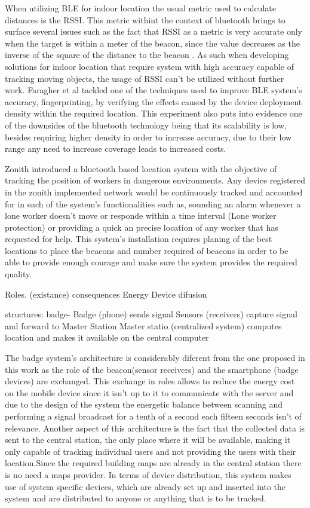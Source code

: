 When utilizing BLE for indoor location the usual metric used to calculate distances is the RSSI. This metric withint the context of bluetooth brings to surface several issues such as the fact that RSSI as a metric is very accurate only when the target is within a meter of the beacon, since the value decreases as the inverse of the square of the distance to the beacon . As such when developing solutions for indoor location that require system with high accuracy capable of tracking moving objects, the usage of RSSI can't be utilized without further work. Faragher et al \cite{bleacc} tackled one of the techniques used to improve BLE system's accuracy, fingerprinting, by verifying the effects caused by the device deployment density within the required location. This experiment also puts into evidence one of the downsides of the bluetooth technology being that its scalability is low, besides requiring higher density in order to increase accuracy, due to their low range any need to increase coverage leads to increased costs.


Zonith \cite{zonith} introduced a bluetooth based location system with the objective of tracking the position of workers in dangerous environments. Any device registered in the zonith implemented network would be continuously tracked and accounted for in each of the system's functionalities such as, sounding an alarm whenever a lone worker doesn't move or responde within a time interval (Lone worker protection) or providing a quick an precise location of any worker that has requested for help. This system's installation requires planing of the best locations to place the beacons and number required of beacons in order to be able to provide enough courage and make sure the system provides the required quality.






Roles. (existance) consequences
Energy
Device difusion

structures:
badge-      Badge (phone) sends signal
			Sensors (receivers) capture signal and forward to Master Station
			Master statio (centralized system) computes location and makes it available on the central computer

The badge system's architecture is considerably diferent from the one proposed in this work as the role of the beacon(sensor receivers) and the smartphone (badge devices) are exchanged. This exchange in roles allows to reduce the energy cost on the mobile device since it isn't up to it to communicate with the server and due to the design of the system the energetic balance between scanning and performing a signal broadcast for a tenth of a second each fifteen seconds isn't of relevance. Another aspect of this architecture is the fact that the collected data is sent to the central station, the only place where it will be available, making it only capable of tracking individual users and not providing the users with their location.Since the required building maps are already in the central station there is no need a maps provider. In terms of device distribution, this system makes use of system specific devices, which are already set up and inserted into the system and are distributed to anyone or anything that is to be tracked.


